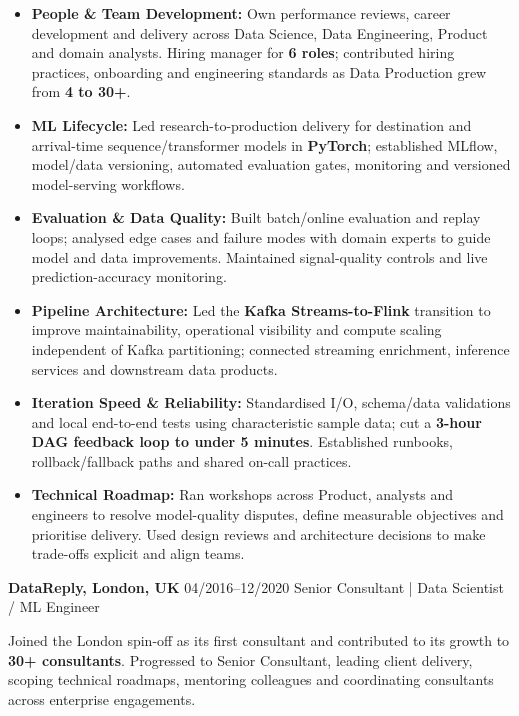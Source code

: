 \documentclass[]{../../../../friggeri-cv}
\renewcommand{\entry}[4]{%
  \parbox[t]{\dimexpr\textwidth-\entryleftinset\relax}{%
    \textbf{#2}%
    {\footnotesize\addfontfeature{Color=lightgray}\hspace{0.6em}#1}%
    \hfill%
    {\small\color{textcolor} #3}\\%
    #4\vspace{\parsep}%
  }\\}
\begin{document}
\begin{entrylist}
{{        }
        \begin{itemize}[leftmargin=1.1em, itemsep=2pt, topsep=3pt, parsep=0pt]
            \item \small\textbf{People \& Team Development:} Own performance reviews, career development and delivery across Data Science, Data Engineering, Product and domain analysts. Hiring manager for \textbf{6 roles}; contributed hiring practices, onboarding and engineering standards as Data Production grew from \textbf{4 to 30+}.
            \item \small\textbf{ML Lifecycle:} Led research-to-production delivery for destination and arrival-time sequence/transformer models in \textbf{PyTorch}; established MLflow, model/data versioning, automated evaluation gates, monitoring and versioned model-serving workflows.
            \item \small\textbf{Evaluation \& Data Quality:} Built batch/online evaluation and replay loops; analysed edge cases and failure modes with domain experts to guide model and data improvements. Maintained signal-quality controls and live prediction-accuracy monitoring.
            \item \small\textbf{Pipeline Architecture:} Led the \textbf{Kafka Streams-to-Flink} transition to improve maintainability, operational visibility and compute scaling independent of Kafka partitioning; connected streaming enrichment, inference services and downstream data products.
            \item \small\textbf{Iteration Speed \& Reliability:} Standardised I/O, schema/data validations and local end-to-end tests using characteristic sample data; cut a \textbf{3-hour DAG feedback loop to under 5 minutes}. Established runbooks, rollback/fallback paths and shared on-call practices.
            \item \small\textbf{Technical Roadmap:} Ran workshops across Product, analysts and engineers to resolve model-quality disputes, define measurable objectives and prioritise delivery. Used design reviews and architecture decisions to make trade-offs explicit and align teams.
        \end{itemize}
    }
    \entry
    {04/2016--12/2020}
    {DataReply, London, UK}
    {Senior Consultant | Data Scientist / ML Engineer}
    {
        {\small
        \setlength{\parindent}{0pt}
        \setlength{\leftskip}{0pt}
        Joined the London spin-off as its first consultant and contributed to its growth to \textbf{30+ consultants}. Progressed to Senior Consultant, leading client delivery, scoping technical roadmaps, mentoring colleagues and coordinating consultants across enterprise engagements.

}}
\end{entrylist}
\end{document}
